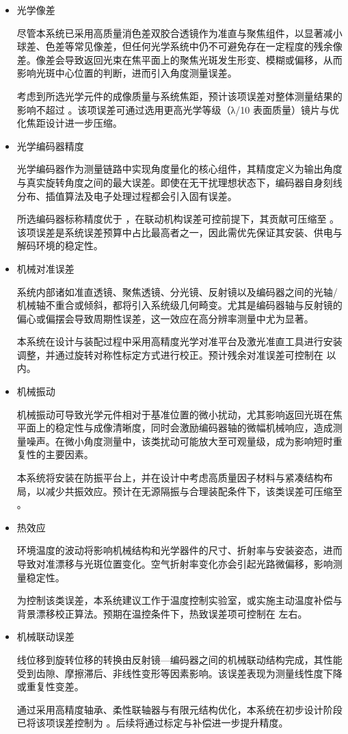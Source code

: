 \begin{itemize}
	\item 光学像差
	
	尽管本系统已采用高质量消色差双胶合透镜作为准直与聚焦组件，以显著减小球差、色差等常见像差，但任何光学系统中仍不可避免存在一定程度的残余像差。像差会导致返回光束在焦平面上的聚焦光斑发生形变、模糊或偏移，从而影响光斑中心位置的判断，进而引入角度测量误差。
	
	考虑到所选光学元件的成像质量与系统焦距，预计该项误差对整体测量结果的影响不超过 。该项误差可通过选用更高光学等级（λ/10 表面质量）镜片与优化焦距设计进一步压缩。
	
	\item 光学编码器精度
	
	光学编码器作为测量链路中实现角度量化的核心组件，其精度定义为输出角度与真实旋转角度之间的最大误差。即使在无干扰理想状态下，编码器自身刻线分布、插值算法及电子处理过程都会引入固有误差。
	
	所选编码器标称精度优于 ，在联动机构误差可控前提下，其贡献可压缩至 。该项误差是系统误差预算中占比最高者之一，因此需优先保证其安装、供电与解码环境的稳定性。
	
	\item 机械对准误差
	
	系统内部诸如准直透镜、聚焦透镜、分光镜、反射镜以及编码器之间的光轴/机械轴不重合或倾斜，都将引入系统级几何畸变。尤其是编码器轴与反射镜的偏心或偏摆会导致周期性误差，这一效应在高分辨率测量中尤为显著。
	
	本系统在设计与装配过程中采用高精度光学对准平台及激光准直工具进行安装调整，并通过旋转对称性标定方式进行校正。预计残余对准误差可控制在  以内。
	
	\item 机械振动
	
	机械振动可导致光学元件相对于基准位置的微小扰动，尤其影响返回光斑在焦平面上的稳定性与成像清晰度，同时会激励编码器轴的微幅机械响应，造成测量噪声。在微小角度测量中，该类扰动可能放大至可观量级，成为影响短时重复性的主要因素。
	
	本系统将安装在防振平台上，并在设计中考虑高质量因子材料与紧凑结构布局，以减少共振效应。预计在无源隔振与合理装配条件下，该类误差可压缩至 。
	
	\item 热效应
	
	环境温度的波动将影响机械结构和光学器件的尺寸、折射率与安装姿态，进而导致对准漂移与光斑位置变化。空气折射率变化亦会引起光路微偏移，影响测量稳定性。
	
	为控制该类误差，本系统建议工作于温度控制实验室，或实施主动温度补偿与背景漂移校正算法。预期在温控条件下，热致误差项可控制在  左右。
	
	\item 机械联动误差
	
	线位移到旋转位移的转换由反射镜—编码器之间的机械联动结构完成，其性能受到齿隙、摩擦滞后、非线性变形等因素影响。该误差表现为测量线性度下降或重复性变差。
	
	通过采用高精度轴承、柔性联轴器与有限元结构优化，本系统在初步设计阶段已将该项误差控制为 。后续将通过标定与补偿进一步提升精度。
\end{itemize}

